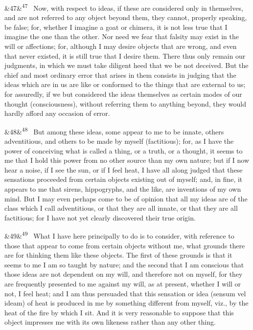 \documentclass[12pt]{article}
\newcommand{\para}[1][]{\par\noindent\ifx&#1&\else\textsuperscript{\footnotesize #1}~\fi}
\begin{document}
\para[47] Now, with respect to ideas, if these are considered only in themselves, and are not referred to any object beyond them, they cannot, properly speaking, be false; for, whether I imagine a goat or chimera, it is not less true that I imagine the one than the other. Nor need we fear that falsity may exist in the will or affections; for, although I may desire objects that are wrong, and even that never existed, it is still true that I desire them. There thus only remain our judgments, in which we must take diligent heed that we be not deceived. But the chief and most ordinary error that arises in them consists in judging that the ideas which are in us are like or conformed to the things that are external to us; for assuredly, if we but considered the ideas themselves as certain modes of our thought (consciousness), without referring them to anything beyond, they would hardly afford any occasion of error.

\para[48] But among these ideas, some appear to me to be innate, others adventitious, and others to be made by myself (factitious); for, as I have the power of conceiving what is called a thing, or a truth, or a thought, it seems to me that I hold this power from no other source than my own nature; but if I now hear a noise, if I see the sun, or if I feel heat, I have all along judged that these sensations proceeded from certain objects existing out of myself; and, in fine, it appears to me that sirens, hippogryphs, and the like, are inventions of my own mind. But I may even perhaps come to be of opinion that all my ideas are of the class which I call adventitious, or that they are all innate, or that they are all factitious; for I have not yet clearly discovered their true origin.

\para[49] What I have here principally to do is to consider, with reference to those that appear to come from certain objects without me, what grounds there are for thinking them like these objects. The first of these grounds is that it seems to me I am so taught by nature; and the second that I am conscious that those ideas are not dependent on my will, and therefore not on myself, for they are frequently presented to me against my will, as at present, whether I will or not, I feel heat; and I am thus persuaded that this sensation or idea (sensum vel ideam) of heat is produced in me by something different from myself, viz., by the heat of the fire by which I sit. And it is very reasonable to suppose that this object impresses me with its own likeness rather than any other thing.
\end{document}
